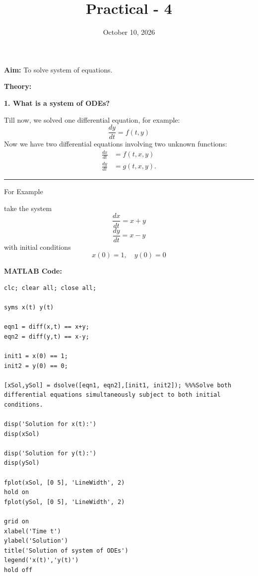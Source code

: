 \documentclass{article}
\title{\textbf{Practical - 4}}
\author{}
\date{October 10, 2026}
\begin{document}
\maketitle

\noindent
\textbf{\large{Aim:}} To solve system of equations.

\vspace{1em}
\noindent
\textbf{\large{Theory:}}

\vspace{0.5em}
\noindent
\textbf{1. What is a system of ODEs?}

\noindent
Till now, we solved one differential equation, for example:
\[\frac{dy}{dt} = f(t, y)\]
Now we have two differential equations involving two unknown functions:
\begin{equation*}
  \boxed{
    \begin{aligned}
      \frac{dx}{dt} &= f(t, x, y) \\
      \frac{dy}{dt} &= g(t, x, y).
    \end{aligned}
  }
\end{equation*}

\begin{center}
  \rule{1.0\textwidth}{0.4pt}
\end{center}

\noindent
For Example

\noindent
take the system
\[\frac{dx}{dt} = x + y\]
\[\frac{dy}{dt} = x - y\]
with initial conditions
\[x(0) = 1, \quad y(0) = 0\]

\vspace{1em}
\noindent
\textbf{\large{MATLAB Code:}}
\begin{lstlisting}
clc; clear all; close all;

syms x(t) y(t)

eqn1 = diff(x,t) == x+y;
eqn2 = diff(y,t) == x-y;

init1 = x(0) == 1;
init2 = y(0) == 0;

[xSol,ySol] = dsolve([eqn1, eqn2],[init1, init2]); %%%Solve both differential equations simultaneously subject to both initial conditions.

disp('Solution for x(t):')
disp(xSol)

disp('Solution for y(t):')
disp(ySol)

fplot(xSol, [0 5], 'LineWidth', 2)
hold on
fplot(ySol, [0 5], 'LineWidth', 2)

grid on
xlabel('Time t')
ylabel('Solution')
title('Solution of system of ODEs')
legend('x(t)','y(t)')
hold off
\end{lstlisting}
\end{document}
